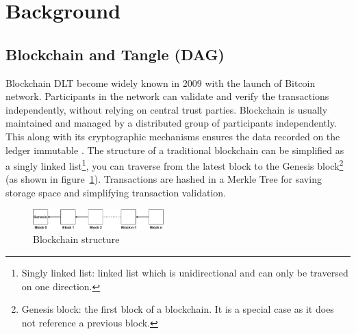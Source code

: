 \section{Background}
\label{sec:background}

\subsection{Blockchain and Tangle (DAG)}
Blockchain DLT become widely known in 2009 with the launch of Bitcoin network. 
Participants in the network can validate and verify the transactions independently, without relying on central trust parties. 
Blockchain is usually maintained and managed by a distributed group of participants independently. 
This along with its cryptographic mechanisms ensures the data recorded on the ledger immutable \cite{Yaga2018BlockchainTO}. 
The structure of a traditional blockchain can be simplified as a singly linked list\footnote{Singly linked list: linked list which is unidirectional and can only be traversed on one direction.}, 
you can traverse from the latest block to the Genesis block\footnote{Genesis block: the first block of a blockchain. It is a special case as it does not reference a previous block.} (as shown in figure~\ref{fig:blockchain_structure}). 
Transactions are hashed in a Merkle Tree \cite{merkle1980protocols} for saving storage space and simplifying transaction validation. 


\begin{figure}[h]
    \includegraphics[width=0.45\textwidth,trim={-2cm -1cm 0 -1cm},clip]{figs/blockchain_structure.pdf}
    \caption{Blockchain structure}
    \label{fig:blockchain_structure}
\end{figure}


